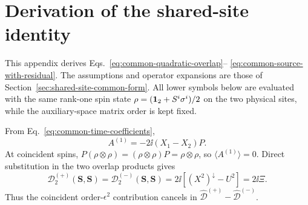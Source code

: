 \section{Derivation of the shared-site identity}
\label{app:shared-site-derivation}

This appendix derives Eqs.~\eqref{eq:common-quadratic-overlap}--
\eqref{eq:common-source-with-residual}.  The assumptions and operator
expansions are those of Section~\ref{sec:shared-site-common-form}.  All
lower symbols below are evaluated with the same rank-one spin state
$\rho=(\mathbf{1}_2+S^i\sigma^i)/2$ on the two physical sites, while the
auxiliary-space matrix order is kept fixed.

From Eq.~\eqref{eq:common-time-coefficients},
\begin{equation}
A^{(1)}=-2\ii(X_1-X_2)P.
\label{eq:app-A1-permutation}
\end{equation}
At coincident spins,
$P(\rho\otimes\rho)=(\rho\otimes\rho)P=\rho\otimes\rho$, so
$\langle A^{(1)}\rangle=0$.  Direct substitution in the two overlap
products gives
\begin{equation}
\mathcal D^{(+)}_2(\boldsymbol S,\boldsymbol S)
=\mathcal D^{(-)}_2(\boldsymbol S,\boldsymbol S)
=2\ii\left[(X^2)^\downarrow-U^2\right]
=2\ii\Xi.
\label{eq:app-D2-coincident}
\end{equation}
Thus the coincident order-$\epsilon^2$ contribution cancels in
$\widehat{\mathcal D}^{(+)}-\widehat{\mathcal D}^{(-)}$.

